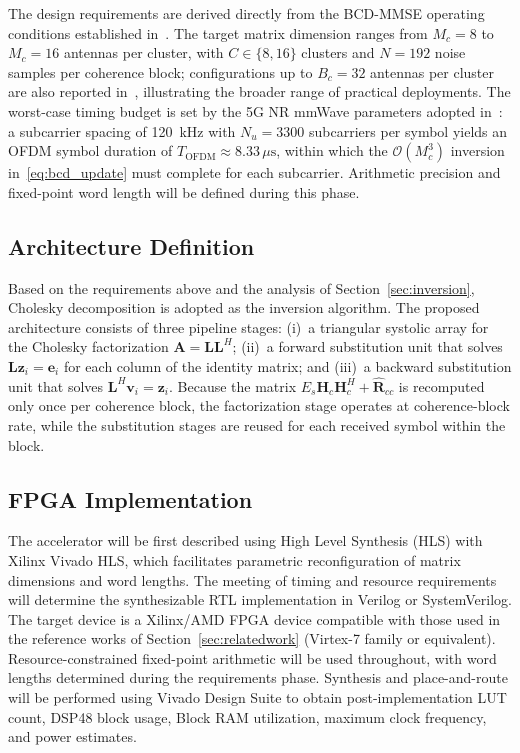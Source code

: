 \documentclass[12pt]{article}
\begin{document}
The design requirements are derived directly from the BCD-MMSE operating
conditions established in~\cite{zhao2025jsac}. The target matrix dimension
ranges from $M_c = 8$ to $M_c = 16$ antennas per cluster, with $C \in
\{8, 16\}$ clusters and $N = 192$ noise samples per coherence block;
configurations up to $B_c = 32$ antennas per cluster are also reported
in~\cite{jeon2019}, illustrating the broader range of practical deployments.
The worst-case timing budget is set by the 5G NR mmWave parameters adopted
in~\cite{zhao2025jsac}: a subcarrier spacing of 120~kHz with $N_u = 3300$
subcarriers per symbol yields an OFDM symbol duration of
$T_\text{OFDM} \approx 8.33\,\mu\text{s}$, within which the
$\mathcal{O}(M_c^3)$ inversion in~\eqref{eq:bcd_update} must complete
for each subcarrier. Arithmetic precision and fixed-point word length
will be defined during this phase.

\subsection{Architecture Definition}

Based on the requirements above and the analysis of
Section~\ref{sec:inversion}, Cholesky decomposition is adopted as the
inversion algorithm. The proposed architecture consists of three pipeline
stages: (i)~a triangular systolic array for the Cholesky factorization
$\mathbf{A} = \mathbf{L}\mathbf{L}^H$; (ii)~a forward substitution unit
that solves $\mathbf{L}\mathbf{z}_i = \mathbf{e}_i$ for each column of
the identity matrix; and (iii)~a backward substitution unit that solves
$\mathbf{L}^H\mathbf{v}_i = \mathbf{z}_i$. Because the matrix
$E_s\mathbf{H}_c\mathbf{H}_c^H + \hat{\mathbf{R}}_{cc}$ is recomputed
only once per coherence block, the factorization stage operates at
coherence-block rate, while the substitution stages are reused for each
received symbol within the block.

\subsection{FPGA Implementation}

The accelerator will be first described using High Level Synthesis (HLS) with Xilinx Vivado HLS, which facilitates parametric reconfiguration of matrix dimensions and word lengths. The meeting of timing and resource requirements will determine the synthesizable RTL implementation in Verilog or SystemVerilog. The target device is a Xilinx/AMD FPGA device compatible with
those used in the reference works of Section~\ref{sec:relatedwork}
(Virtex-7 family or equivalent). Resource-constrained fixed-point
arithmetic will be used throughout, with word lengths determined during
the requirements phase. Synthesis and place-and-route will be performed
using Vivado Design Suite to obtain post-implementation LUT count,
DSP48 block usage, Block RAM utilization, maximum clock frequency, and power estimates.
\end{document}
